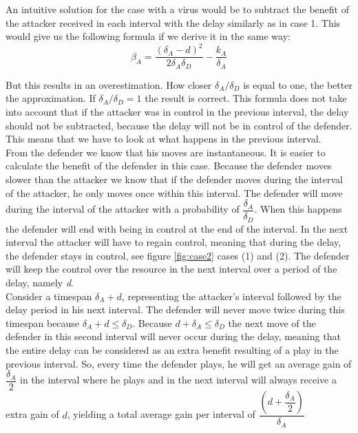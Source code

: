 An intuitive solution for the case with a virus would be to subtract the benefit of the attacker received in each interval with the delay similarly as in case 1. This would give us the following formula if we derive it in the same way:
\begin{equation*}
\beta_{A}=\dfrac{(\delta_{A} - d)^2}{2\delta_{A}\delta_{D}} - \dfrac{k_{A}}{\delta_{A}}
\end{equation*}

But this results in an overestimation. How closer $\delta_{A}/\delta_{D}$ is equal to one, the better the approximation. If $\delta_{A}/\delta_{D} = 1$ the result is correct. This formula does not take into account that if the attacker was in control in the previous interval, the delay should not be subtracted, because the delay will not be in control of the defender. This means that we have to look at what happens in the previous interval. \\

From the defender we know that his moves are instantaneous. It is easier to calculate the benefit of the defender in this case. Because the defender moves slower than the attacker we know that if the defender moves during the interval of the attacker, he only moves once within this interval.
The defender will move during the interval of the attacker with a probability of $\dfrac{\delta_{A}}{\delta_{D}} $. When this happens the defender will end with being in control at the end of the interval. In the next interval the attacker will have to regain control, meaning that during the delay, the defender stays in control, see figure \ref{fig:case2} cases (1) and (2). The defender will keep the control over the resource in the next interval over a period of the delay, namely \textit{d}. \\

Consider a timespan $\delta_{A} + d$, representing the attacker's interval followed by the delay period in his next interval. The defender will never move twice during this timespan because $\delta_{A} + d \leq \delta_{D}$.
Because $d + \delta_{A} \leq \delta_{D}$ the next move of the defender in this second interval will never occur during the delay, meaning that the entire delay can be considered as an extra benefit resulting of a play in the previous interval. 
So, every time the defender plays, he will get an average gain of $\dfrac{\delta_{A}}{2}$ in the interval where he plays and in the next interval will always receive a extra gain of $d$, yielding a total average gain per interval of
$\dfrac{(d+\dfrac{\delta_{A}}{2})}{\delta_{A}}$

